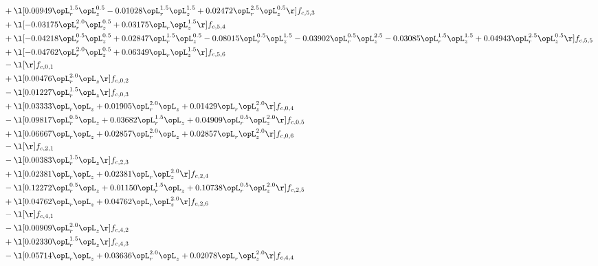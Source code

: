 \begin{alignat}{2}
& + \l[  0.00949 \opL_r^{1.5} \opL_z^{0.5}   -0.01028 \opL_r^{1.5} \opL_z^{1.5} +  0.02472 \opL_r^{2.5} \opL_z^{0.5}  \r] f_{c,5,3} \nonumber \\ 
& + \l[  -0.03175 \opL_r^{2.0} \opL_z^{0.5} +  0.03175 \opL_r \opL_z^{1.5}  \r] f_{c,5,4} \nonumber \\ 
& + \l[  -0.04218 \opL_r^{0.5} \opL_z^{0.5} +  0.02847 \opL_r^{1.5} \opL_z^{0.5}   -0.08015 \opL_r^{0.5} \opL_z^{1.5}   -0.03902 \opL_r^{0.5} \opL_z^{2.5}   -0.03085 \opL_r^{1.5} \opL_z^{1.5} +  0.04943 \opL_r^{2.5} \opL_z^{0.5}  \r] f_{c,5,5} \nonumber \\ 
& + \l[  -0.04762 \opL_r^{2.0} \opL_z^{0.5} +  0.06349 \opL_r \opL_z^{1.5}  \r] f_{c,5,6} \nonumber \\ 
& - \l[  \r] f_{c,0,1} \nonumber \\ 
& + \l[  0.00476 \opL_r^{2.0} \opL_z  \r] f_{c,0,2} \nonumber \\ 
& - \l[  0.01227 \opL_r^{1.5} \opL_z  \r] f_{c,0,3} \nonumber \\ 
& + \l[  0.03333 \opL_r \opL_z +  0.01905 \opL_r^{2.0} \opL_z +  0.01429 \opL_r \opL_z^{2.0}  \r] f_{c,0,4} \nonumber \\ 
& - \l[  0.09817 \opL_r^{0.5} \opL_z +  0.03682 \opL_r^{1.5} \opL_z +  0.04909 \opL_r^{0.5} \opL_z^{2.0}  \r] f_{c,0,5} \nonumber \\ 
& + \l[  0.06667 \opL_r \opL_z +  0.02857 \opL_r^{2.0} \opL_z +  0.02857 \opL_r \opL_z^{2.0}  \r] f_{c,0,6} \nonumber \\ 
& - \l[  \r] f_{c,2,1} \nonumber \\ 
& - \l[  0.00383 \opL_r^{1.5} \opL_z  \r] f_{c,2,3} \nonumber \\ 
& + \l[  0.02381 \opL_r \opL_z +  0.02381 \opL_r \opL_z^{2.0}  \r] f_{c,2,4} \nonumber \\ 
& - \l[  0.12272 \opL_r^{0.5} \opL_z +  0.01150 \opL_r^{1.5} \opL_z +  0.10738 \opL_r^{0.5} \opL_z^{2.0}  \r] f_{c,2,5} \nonumber \\ 
& + \l[  0.04762 \opL_r \opL_z +  0.04762 \opL_r \opL_z^{2.0}  \r] f_{c,2,6} \nonumber \\ 
& - \l[  \r] f_{c,4,1} \nonumber \\ 
& - \l[  0.00909 \opL_r^{2.0} \opL_z  \r] f_{c,4,2} \nonumber \\ 
& + \l[  0.02330 \opL_r^{1.5} \opL_z  \r] f_{c,4,3} \nonumber \\ 
& - \l[  0.05714 \opL_r \opL_z +  0.03636 \opL_r^{2.0} \opL_z +  0.02078 \opL_r \opL_z^{2.0}  \r] f_{c,4,4} \nonumber \\ 

\end{alignat}
